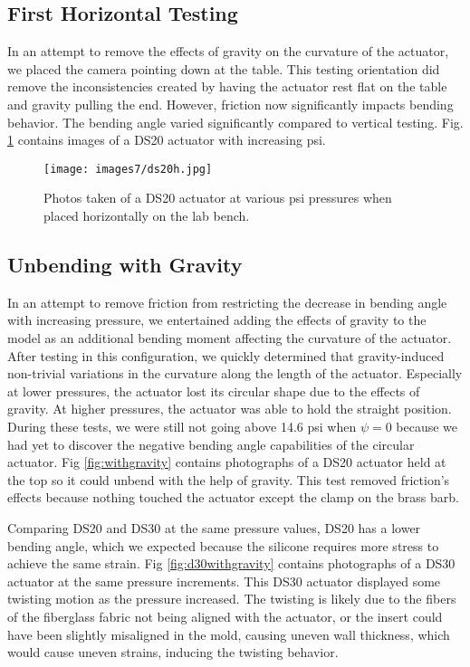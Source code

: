 \subsection{First Horizontal Testing}

In an attempt to remove the effects of gravity on the curvature of the actuator, we placed the camera pointing down at the table. This testing orientation did remove the inconsistencies created by having the actuator rest flat on the table and gravity pulling the end. However, friction now significantly impacts bending behavior. The bending angle varied significantly compared to vertical testing. Fig. \ref{fig:ds20h} contains images of a DS20 actuator with increasing psi. 

\begin{figure}[ht]
    \centering
     \texttt{[image: images7/ds20h.jpg]}
    \caption{Photos taken of a DS20 actuator at various psi pressures when placed horizontally on the lab bench.}
    \label{fig:ds20h}
\end{figure}

\subsection{Unbending with Gravity}

In an attempt to remove friction from restricting the decrease in bending angle with increasing pressure, we entertained adding the effects of gravity to the model as an additional bending moment affecting the curvature of the actuator. After testing in this configuration, we quickly determined that gravity-induced non-trivial variations in the curvature along the length of the actuator. Especially at lower pressures, the actuator lost its circular shape due to the effects of gravity. At higher pressures, the actuator was able to hold the straight position. During these tests, we were still not going above 14.6 psi when $\psi=0$ because we had yet to discover the negative bending angle capabilities of the circular actuator. Fig \ref{fig:withgravity} contains photographs of a DS20 actuator held at the top so it could unbend with the help of gravity. This test removed friction's effects because nothing touched the actuator except the clamp on the brass barb. 

Comparing DS20 and DS30 at the same pressure values, DS20 has a lower bending angle, which we expected because the silicone requires more stress to achieve the same strain. Fig \ref{fig:d30withgravity} contains photographs of a DS30 actuator at the same pressure increments. This DS30 actuator displayed some twisting motion as the pressure increased. The twisting is likely due to the fibers of the fiberglass fabric not being aligned with the actuator, or the insert could have been slightly misaligned in the mold, causing uneven wall thickness, which would cause uneven strains, inducing the twisting behavior.

